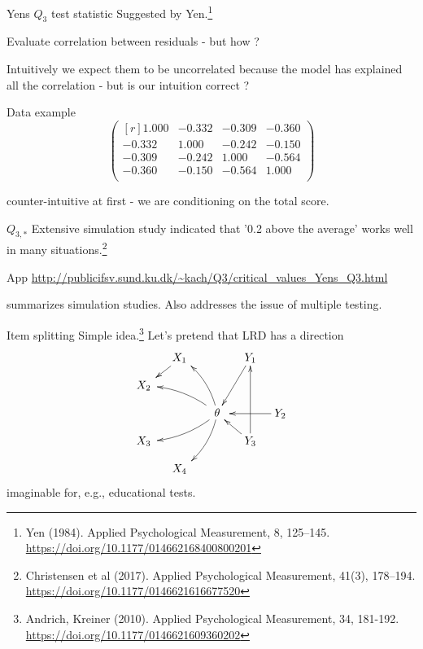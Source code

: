 \documentclass[xcolor=table]{beamer}
\begin{document}
\begin{frame}{Yens $Q_3$ test statistic}
Suggested by Yen.\footnote{Yen (1984). Applied Psychological Measurement, 8, 125–145. \url{https://doi.org/10.1177/014662168400800201}} 
\begin{block}{Evaluate} 
correlation between residuals
\pause 
- but how ?
\end{block}
\pause 
Intuitively we expect them to be uncorrelated because the model has explained all the correlation
\pause 
- but is our intuition correct ?
\pause
\begin{block}{Data example} 
$$
\begin{pmatrix*}[r]
 1.000 & -0.332 & -0.309 & -0.360 \\ 
-0.332 &  1.000 & -0.242 & -0.150 \\ 
-0.309 & -0.242 &  1.000 & -0.564 \\ 
-0.360 & -0.150 & -0.564 &  1.000 \\     
\end{pmatrix*}
$$
\end{block}
counter-intuitive at first
\pause
- we are conditioning on the total score.
\end{frame}

\begin{frame}{$Q_{3,\ast}$}
Extensive simulation study indicated that '0.2 above the average' works well in many situations.\footnote{Christensen et al (2017). Applied Psychological Measurement, 41(3), 178–194. \url{https://doi.org/10.1177/0146621616677520}}
\begin{block}{App}
\scriptsize\url{http://publicifsv.sund.ku.dk/~kach/Q3/critical_values_Yens_Q3.html}
\end{block}
summarizes simulation studies. Also addresses the issue of multiple testing.
\end{frame}

\begin{frame}{Item splitting}
Simple idea.\footnote{Andrich, Kreiner (2010). Applied Psychological Measurement, 34, 181-192. \url{https://doi.org/10.1177/0146621609360202}}
Let's pretend that LRD has a direction
$$
\xymatrix@=1em{
     &X_1\;\ar@{->}[dl]&                                                               &Y_1\ar[ddl]                  \\
X_2\;&     &                                                               &                             \\
     &     &\ar@/_/[uul]\ar@/_/[ull]\ar@/^/[dll]\ar@/^/[ddl] \;\;\theta\;\;&                  &Y_2\ar[ll]\\
X_3\;&     &                                                               &Y_3\ar[uuu]\ar[ul]           \\
     &X_4\;&                                                               &
}
$$
\pause
imaginable for, e.g., educational tests. 
\end{frame}
\end{document}
